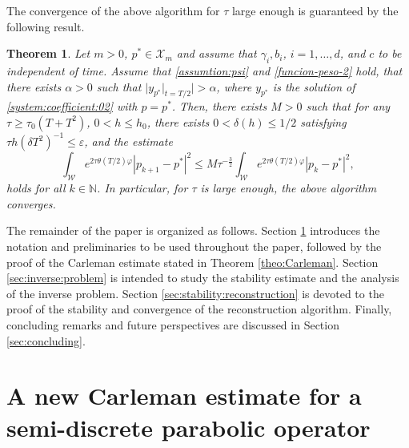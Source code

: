 \documentclass{amsart}
\numberwithin{equation}{section}
\newtheorem{theorem}{Theorem}[section]
\begin{document}
The convergence of the above algorithm for $\tau$ large enough is guaranteed by the following result.

\begin{theorem}\label{theo:convergence} Let $m>0$, $p^\ast\in\mathcal{X}_{m}$ and assume that $\gamma_i, b_i$, $i=1,\ldots,d$, and $c$ to be independent of time. Assume that  \eqref{assumtion:psi} and \eqref{funcion-peso-2} hold, that there exists $\alpha>0$ such that
$\Big|y_{p^{\ast}}|_{t=T/2}\Big|>\alpha$, where $y_{p^\ast}$ is the solution of \eqref{system:coefficient:02} with $p=p^\ast$. Then, there exists $M > 0$ such that for any $\tau\geq \tau_{0}(T+T^{2})$, $0<h\leq h_{0}$, there exists $0<\delta(h) \leq 1/2$ satisfying $\tau h(\delta T^{2})^{-1}\leq \varepsilon$, and the estimate
$$\int_{\mathcal{W}}e^{2\tau\theta(T/2)\varphi}|p_{k+1}-p^\ast|^2\leq M \tau^{-\frac{3}{2}}\int_{\mathcal{W}}e^{2\tau\theta(T/2)\varphi}|p_k-p^\ast|^2,$$ holds for all $k\in\mathbb{N}$.
In particular, for $\tau$ is large enough, the above algorithm converges.
\end{theorem}
The remainder of the paper is organized as follows. Section \ref{sec:proof:carleman} introduces the notation and preliminaries to be used throughout the paper, followed by the proof of the Carleman estimate stated in Theorem \ref{theo:Carleman}. Section \ref{sec:inverse:problem} is intended to study the stability estimate and the analysis of the inverse problem. Section \ref{sec:stability:reconstruction} is devoted to the proof of the stability and convergence of the reconstruction algorithm. Finally, concluding remarks and future perspectives are discussed in Section \ref{sec:concluding}.

\section{A new Carleman estimate for a semi-discrete parabolic operator}\label{sec:proof:carleman}

\end{document}
